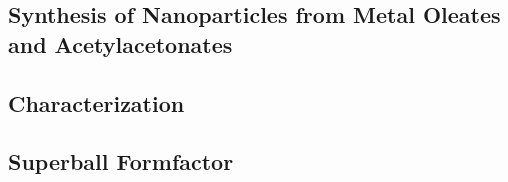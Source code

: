 \documentclass[\main/dresen_thesis.tex]{subfiles}
\renewcommand{\thisPath}{\main/chapters/monolayers/experimentalMethods/}
\begin{document}
  \subsection{Synthesis of  Nanoparticles from Metal Oleates and Acetylacetonates}
    
      \FloatBarrier
  \subsection{Characterization}
    
      \FloatBarrier
  \subsection{Superball Formfactor}
    
      \FloatBarrier
\end{document}
